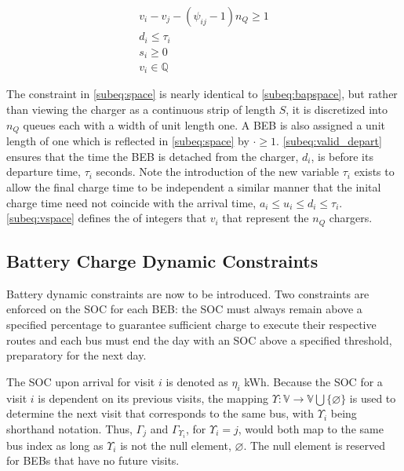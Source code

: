 \documentclass[utf8]{FrontiersinHarvard}
\begin{document}
\begin{subequations}
\label{eq:packconstrs}
\begin{align}
    v_i - v_j - (\psi_{ij} - 1)n_Q \geq 1 \label{subeq:space} \\ d_i \leq \tau_i \label{subeq:valid_depart} \\ s_i \geq
    0 \label{subeq:pos_charge} \\ v_i \in \mathbb{Q} \label{subeq:vspace}
\end{align}
\end{subequations}

The constraint in \autoref{subeq:space} is nearly identical to \autoref{subeq:bapspace}, but rather than viewing the
charger as a continuous strip of length \(S\), it is discretized into \(n_Q\) queues each with a width of unit length one. A
BEB is also assigned a unit length of one which is reflected in \autoref{subeq:space} by \(\cdot \geq 1\).
\autoref{subeq:valid_depart} ensures that the time the BEB is detached from the charger, \(d_i\), is before its departure
time, \(\tau_i\) seconds. Note the introduction of the new variable \(\tau_i\) exists to allow the final charge time to be
independent a similar manner that the inital charge time need not coincide with the arrival time, \(a_i \le u_i \le d_i \le
\tau_i\). \autoref{subeq:vspace} defines the of integers that \(v_i\) that represent the \(n_Q\) chargers.

\subsection{Battery Charge Dynamic Constraints}
\label{sec:batt_dynamics}
Battery dynamic constraints are now to be introduced. Two constraints are enforced on the SOC for each BEB: the SOC must
always remain above a specified percentage to guarantee sufficient charge to execute their respective routes and each
bus must end the day with an SOC above a specified threshold, preparatory for the next day.

The SOC upon arrival for visit \(i\) is denoted as \(\eta_i\) kWh. Because the SOC for a visit \(i\) is dependent on its previous
visits, the mapping \(\Upsilon: \mathbb{V} \rightarrow \mathbb{V} \bigcup \{\varnothing\}\) is used to determine the next visit that corresponds
to the same bus, with \(\Upsilon_i\) being shorthand notation. Thus, \(\Gamma_j\) and \(\Gamma_{\Upsilon_i}\), for \(\Upsilon_i = j\), would both map to the
same bus index as long as \(\Upsilon_i\) is not the null element, \(\varnothing\). The null element is reserved for BEBs that have
no future visits.
\end{document}
